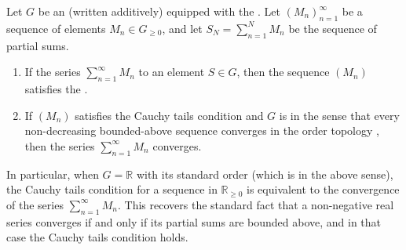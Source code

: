 \begin{proposition} \label{proposition:convergence_of_series_implies_cauchy_tails_condition_in_ordered_abelian_group}
    Let $G$ be an  (written additively) equipped with the . Let $(M_n)_{n=1}^\infty$ be a sequence of  elements $M_n \in G_{\ge 0}$, and let $S_N = \sum_{n=1}^N M_n$ be the sequence of partial sums.

    \begin{enumerate}
        \item \label{item:convergence_implies_cauchy_tails}If the series $\sum_{n=1}^\infty M_n$  to an element $S \in G$, then the sequence $(M_n)$ satisfies the .

        \item \label{item:cauchy_tails_and_completeness_implies_convergence}If $(M_n)$ satisfies the Cauchy tails condition and $G$ is  in the sense that every non-decreasing bounded-above sequence converges in the order topology , then the series $\sum_{n=1}^\infty M_n$ converges.
    \end{enumerate}

    In particular, when $G = \mathbb{R}$ with its standard order (which is  in the above sense), the Cauchy tails condition for a sequence in $\mathbb{R}_{\ge 0}$ is equivalent to the convergence of the series $\sum_{n=1}^\infty M_n$. This recovers the standard fact that a non-negative real series converges if and only if its partial sums are bounded above, and in that case the Cauchy tails condition holds.
\end{proposition}

